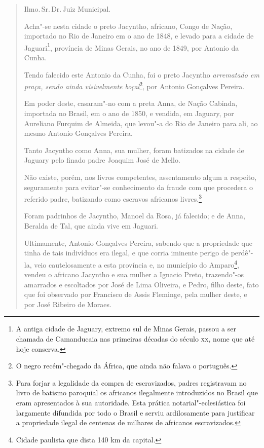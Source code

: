 \begin{quote}
Ilmo.\,Sr.\,Dr.\,Juiz Municipal.

Acha"-se nesta cidade o preto Jacyntho, africano, Congo de Nação,
importado no Rio de Janeiro em o ano de 1848, e levado para a cidade de
Jaguari\footnote{A antiga cidade de Jaguary, extremo sul de Minas
  Gerais, passou a ser chamada de Camanducaia nas primeiras décadas do
  século \textsc{xx}, nome que até hoje conserva.}, província de Minas Gerais, no
ano de 1849, por Antonio da Cunha.

Tendo falecido este Antonio da Cunha, foi o preto Jacyntho
\emph{arrematado em praça, sendo ainda visivelmente boçal}\footnote{O
  negro recém"-chegado da África, que ainda não falava o português.}, por
Antonio Gonçalves Pereira.

Em poder deste, casaram"-no com a preta Anna, de Nação Cabinda, importada
no Brasil, em o ano de 1850, e vendida, em Jaguary, por Aureliano
Furquim de Almeida, que levou"-a do Rio de Janeiro para ali, ao mesmo
Antonio Gonçalves Pereira.

Tanto Jacyntho como Anna, sua mulher, foram batizados na cidade de
Jaguary pelo finado padre Joaquim José de Mello.

Não existe, porém, nos livros competentes, assentamento algum a
respeito, seguramente para evitar"-se conhecimento da fraude com que
procedera o referido padre, batizando como escravos africanos
livres.\footnote{Para forjar a legalidade da compra de escravizados,
  padres registravam no livro de batismo paroquial os africanos
  ilegalmente introduzidos no Brasil que eram apresentados à sua
  autoridade. Esta prática notarial"-eclesiástica foi largamente
  difundida por todo o Brasil e serviu ardilosamente para justificar a
  propriedade ilegal de centenas de milhares de africanos escravizados.}

Foram padrinhos de Jacyntho, Manoel da Rosa, já falecido; e de Anna,
Beralda de Tal, que ainda vive em Jaguari.

Ultimamente, Antonio Gonçalves Pereira, sabendo que a propriedade que
tinha de tais indivíduos era ilegal, e que corria iminente perigo de
perdê"-la, veio cautelosamente a esta província e, no município do
Amparo\footnote{Cidade paulista que dista 140 km da capital.}, vendeu
o africano Jacyntho e sua mulher a Ignacio Preto, trazendo"-os amarrados
e escoltados por José de Lima Oliveira, e Pedro, filho deste, fato que
foi observado por Francisco de Assis Fleminge, pela mulher deste, e por
José Ribeiro de Moraes.


\end{quote}
